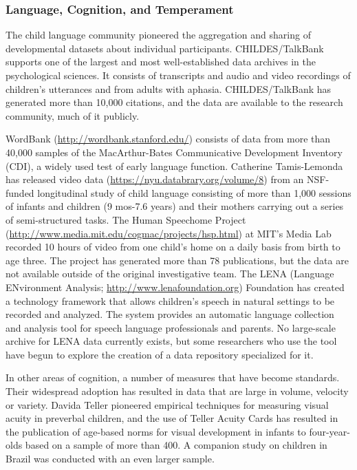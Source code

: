 \documentclass[letterpaper,man,apacite,natbib]{apa6}
\begin{document}
\subsubsection{Language, Cognition, and Temperament}
The child language community pioneered the aggregation and sharing of developmental datasets about individual participants.
CHILDES/TalkBank \cite{macwhinney_childes_2001} supports one of the largest and most well-established data archives in the psychological sciences.
It consists of transcripts and audio and video recordings of children's utterances and from adults with aphasia.
CHILDES/TalkBank has generated more than 10,000 citations, and the data are available to the research community, much of it publicly.

WordBank (\url{http://wordbank.stanford.edu/}) consists of data from more than 40,000 samples of the MacArthur-Bates Communicative Development Inventory (CDI), a widely used test of early language function.
Catherine Tamis-Lemonda has released video data (\url{https://nyu.databrary.org/volume/8}) from an NSF-funded longitudinal study of child language consisting of more than 1,000 sessions of infants and children (9 mos-7.6 years) and their mothers carrying out a series of semi-structured tasks.
The Human Speechome Project (\url{http://www.media.mit.edu/cogmac/projects/hsp.html}) at MIT's Media Lab recorded 10 hours of video from one child's home on a daily basis from birth to age three.
The project has generated more than 78 publications, but the data are not available outside of the original investigative team.
The LENA (Language ENvironment Analysis; \url{http://www.lenafoundation.org}) Foundation has created a technology framework that allows children's speech in natural settings to be recorded and analyzed.
The system provides an automatic language collection and analysis tool for speech language professionals and parents.
No large-scale archive for LENA data currently exists, but some researchers who use the tool have begun to explore the creation of a data repository specialized for it.

In other areas of cognition, a number of measures that have become standards.
Their widespread adoption has resulted in data that are large in volume, velocity or variety.
Davida Teller \cite{teller1986assessment} pioneered empirical techniques for measuring visual acuity in preverbal children, and the use of Teller Acuity Cards has resulted in the publication of age-based norms for visual development in infants to four-year-olds \cite{mayer_monocular_1995} based on a sample of more than 400.
A companion study on children in Brazil \cite{salomao_large_1995} was conducted with an even larger sample.
\end{document}

